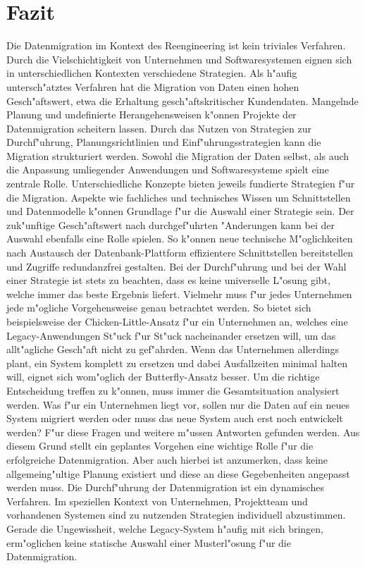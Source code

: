 \section{Fazit}
\label{chapter:fazit}

Die Datenmigration im Kontext des Reengineering ist kein triviales Verfahren. Durch die Vielschichtigkeit von Unternehmen und Softwaresystemen eignen sich in unterschiedlichen Kontexten verschiedene Strategien. Als h"aufig untersch"atztes Verfahren hat die Migration von Daten einen hohen Gesch"aftswert, etwa die Erhaltung gesch"aftskritischer Kundendaten. Mangelnde Planung und undefinierte Herangehensweisen k"onnen Projekte der Datenmigration scheitern lassen. Durch das Nutzen von Strategien zur Durchf"uhrung, Planungsrichtlinien und Einf"uhrungsstrategien kann die Migration strukturiert werden.
\lb
Sowohl die Migration der Daten selbst, als auch die Anpassung umliegender Anwendungen und Softwaresysteme spielt eine zentrale Rolle. Unterschiedliche Konzepte bieten jeweils fundierte Strategien f"ur die Migration. Aspekte wie fachliches und technisches Wissen um Schnittstellen und Datenmodelle k"onnen Grundlage f"ur die Auswahl einer Strategie sein. Der zuk"unftige Gesch"aftswert nach durchgef"uhrten "Anderungen kann bei der Auswahl ebenfalls eine Rolle spielen. So k"onnen neue technische M"oglichkeiten nach Austausch der Datenbank-Plattform effizientere Schnittstellen bereitstellen und Zugriffe redundanzfrei gestalten.
\lb
Bei der Durchf"uhrung und bei der Wahl einer Strategie ist stets zu beachten, dass es keine universelle L"osung gibt, welche immer das beste Ergebnis liefert. Vielmehr muss f"ur jedes Unternehmen jede m"ogliche Vorgehensweise genau betrachtet werden. So bietet sich beispielsweise der Chicken-Little-Ansatz f"ur ein Unternehmen an, welches eine Legacy-Anwendungen St"uck f"ur St"uck nacheinander ersetzen will, um das allt"agliche Gesch"aft nicht zu gef"ahrden. Wenn das Unternehmen allerdings plant, ein System komplett zu ersetzen und dabei Ausfallzeiten minimal halten will, eignet sich wom"oglich der Butterfly-Ansatz besser. 
\lb
Um die richtige Entscheidung treffen zu k"onnen, muss immer die Gesamtsituation analysiert werden. Was f"ur ein Unternehmen liegt vor, sollen nur die Daten auf ein neues System migriert werden oder muss das neue System auch erst noch entwickelt werden? F"ur diese Fragen und weitere m"ussen Antworten gefunden werden. Aus diesem Grund stellt ein geplantes Vorgehen eine wichtige Rolle f"ur die erfolgreiche Datenmigration. Aber auch hierbei ist anzumerken, dass keine allgemeing"ultige Planung existiert und diese an diese Gegebenheiten angepasst werden muss. 
\lb
Die Durchf"uhrung der Datenmigration ist ein dynamisches Verfahren. Im speziellen Kontext von Unternehmen, Projektteam und vorhandenen Systemen sind zu nutzenden Strategien individuell abzustimmen. Gerade die Ungewissheit, welche Legacy-System h"aufig mit sich bringen, erm"oglichen keine statische Auswahl einer Musterl"osung f"ur die Datenmigration.